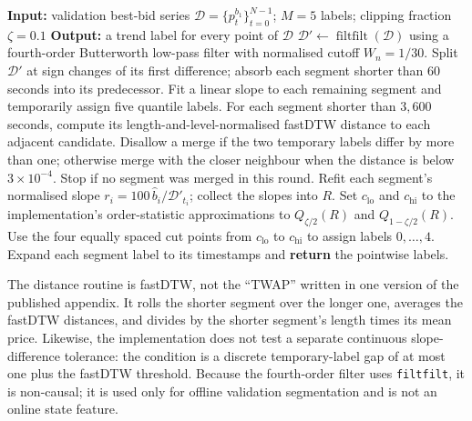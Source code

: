 \begin{algorithm}[!htb]
\caption{Market Segmentation and Labelling}
\label{alg:earnhft_segment}
\begin{algorithmic}[1]
\State \textbf{Input:} validation best-bid series $\mathcal{D}=\{p_t^{b_1}\}_{t=0}^{N-1}$; $M=5$ labels; clipping fraction $\zeta=0.1$
\State \textbf{Output:} a trend label for every point of $\mathcal{D}$
\State $\mathcal{D}'\gets\operatorname{filtfilt}(\mathcal{D})$ using a fourth-order Butterworth low-pass filter with normalised cutoff $W_n=1/30$.
\State Split $\mathcal{D}'$ at sign changes of its first difference; absorb each segment shorter than 60 seconds into its predecessor.
  \State Fit a linear slope to each remaining segment and temporarily assign five quantile labels.
  \State For each segment shorter than $3{,}600$ seconds, compute its length-and-level-normalised fastDTW distance to each adjacent candidate.
  \State Disallow a merge if the two temporary labels differ by more than one; otherwise merge with the closer neighbour when the distance is below $3\times10^{-4}$.
  \State Stop if no segment was merged in this round.
\EndFor
\State Refit each segment's normalised slope $r_i=100\,\widehat{b}_i/\mathcal{D}'_{t_i}$; collect the slopes into $R$.
\State Set $c_{\mathrm{lo}}$ and $c_{\mathrm{hi}}$ to the implementation's order-statistic approximations to $Q_{\zeta/2}(R)$ and $Q_{1-\zeta/2}(R)$.
\State Use the four equally spaced cut points from $c_{\mathrm{lo}}$ to $c_{\mathrm{hi}}$ to assign labels $0,\ldots,4$.
\State Expand each segment label to its timestamps and \textbf{return} the pointwise labels.
\end{algorithmic}
\end{algorithm}

The distance routine is fastDTW, not the ``TWAP'' written in one version of the published appendix. It rolls the shorter segment over the longer one, averages the fastDTW distances, and divides by the shorter segment's length times its mean price. Likewise, the implementation does not test a separate continuous slope-difference tolerance: the condition is a discrete temporary-label gap of at most one plus the fastDTW threshold. Because the fourth-order filter uses \texttt{filtfilt}, it is non-causal; it is used only for offline validation segmentation and is not an online state feature.

